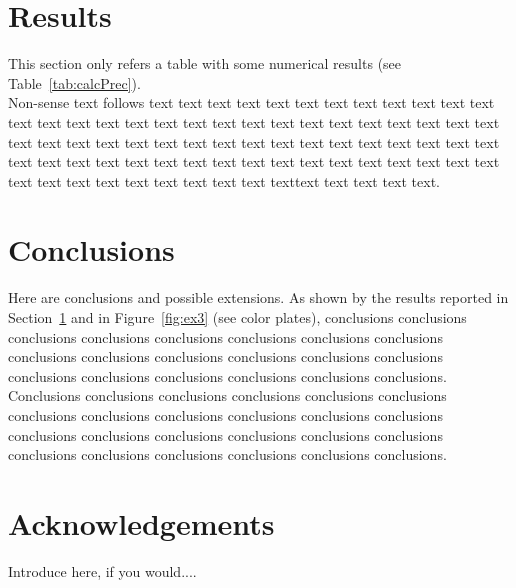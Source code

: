 \documentclass{egpubl}
\begin{document}
\section{Results}
\label{sec:results}

This section only refers a table with some numerical results (see
Table~\ref{tab:calcPrec}). \\
Non-sense text follows text text text text text text text text text text text
text text text text text text text text text text text text text text text
text text text text text text text text text text text text text text text
text text text text text text text text text text text text text text text
text text text text text text text text text text text text text text text
text texttext text text text text.


\section{Conclusions}
\label{sec:concl}

Here are conclusions and possible extensions. As shown by the results
reported in Section~\ref{sec:results} and in Figure~\ref{fig:ex3} (see color
plates), conclusions conclusions conclusions conclusions conclusions
conclusions conclusions conclusions conclusions conclusions conclusions
conclusions conclusions conclusions conclusions conclusions conclusions
conclusions conclusions conclusions. Conclusions conclusions conclusions
conclusions conclusions conclusions conclusions conclusions conclusions
conclusions conclusions conclusions conclusions conclusions conclusions
conclusions conclusions conclusions conclusions conclusions conclusions
conclusions conclusions conclusions.


\section*{Acknowledgements}

Introduce here, if you would....
\end{document}
